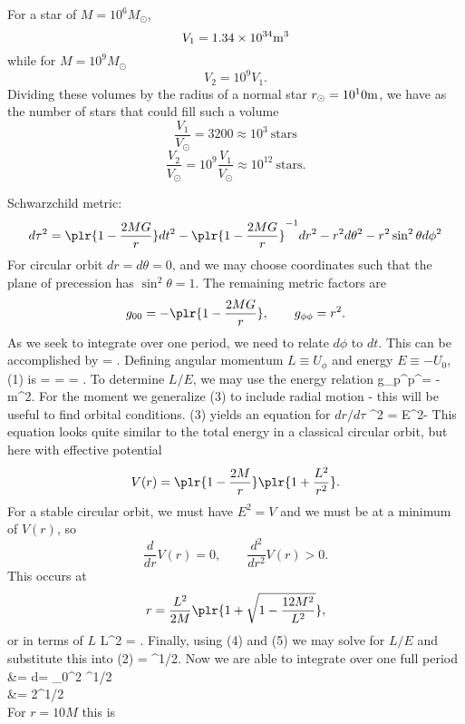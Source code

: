 \documentclass[10pt,letterpaper]{article}
\begin{document}
For a star of $M = 10^6 M_{\odot}$,
\[
	V_1 = 1.34\times 10^{34} \text m^3
\]
while for $M = 10^9 M_{\odot}$
\[
	V_2 = 10^9 V_1.
\]
Dividing these volumes by the radius of a normal star $r_{\odot} = 10^10 \text m$,
we have as the number of stars that could fill such a volume
\[
	\frac{V_1}{V_{\odot}} = 3200 \approx 10^3\ \text{stars}
\]
\[
	\frac{V_2}{V_{\odot}} =  10^9 \frac{V_1}{V_{\odot}}\approx 10^{12} \ \text{stars}.
\]
\item 
\benum
\item
Schwarzchild metric:
\[
	d\tau^2 = \plr{ 1-\frac{2MG}{r}}dt^2-\plr{ 1-\frac{2MG}{r}}^{-1}dr^2 - r^2 d\theta^2 - r^2\sin^2\theta d\phi^2
\]
For circular orbit $dr = d\theta = 0$, and we may choose coordinates such that the plane of precession has $\sin^2\theta = 1$. The remaining metric factors are
\[
	g_{00} = -\plr{1-\frac{2MG}{r}},\qquad g_{\phi\phi} = r^2.
\]
As we seek to integrate over one period, we need to relate $d\phi$ to $dt$. This can be accomplished by
\be
	 = .
\ee
Defining angular momentum $L\equiv U_\phi$ and energy $E \equiv -U_0$, (1) is
\be
	= =  = .
\ee
To determine $L/E$, we may use the energy relation 
\be
	g_{\mu\nu}p^\mu p^\nu = -m^2.
\ee
For the moment we generalize (3) to include radial motion - this will be useful to find orbital conditions. (3) yields an equation for $dr/d\tau$
\be
	^2 = E^2- 
\ee
This equation looks quite similar to the total energy in a classical circular orbit, but here with effective potential
\[
	V(r) = \plr{1-\frac{2M}{r}}\plr{1+\frac{L^2}{r^2}}.
\]
For a stable circular orbit, we must have $E^2 = V$ and we must be at a minimum of $V(r)$, so
\[
	\frac{d}{dr}V(r)= 0,\qquad \frac{d^2}{dr^2}V(r) >0.
\]
This occurs at 
\[
	r = \frac{L^2}{2M}\plr{1+\sqrt{1-\frac{12M^2}{L^2}}},
\]
or in terms of $L$
\be
	L^2 = .
\ee 
Finally, using (4) and (5) we may solve for $L/E$ and substitute this into (2)
\be
	 = ^{1/2}.
\ee
Now we are able to integrate over one full period
\ba
	\tau &= \int d\tau = \int_0^{2\pi} ^{1/2}\\
	&=  2\pi{}^{1/2}\\
\ea
For $r=10M$ this is
\end{document}
